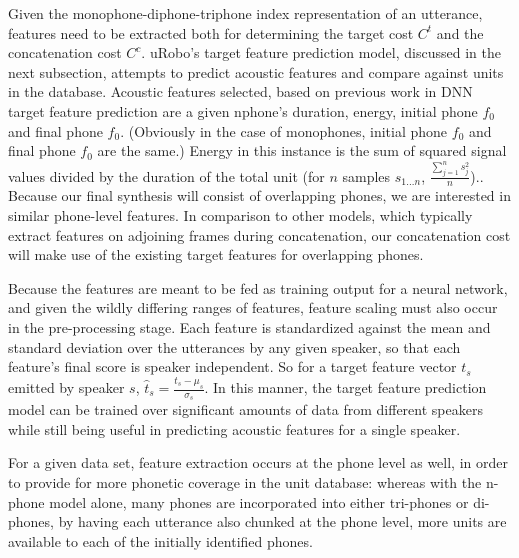 \documentclass[10pt, journal, compsoc]{IEEEtran}
\begin{document}
Given the monophone-diphone-triphone index representation of an utterance, features need to be extracted both for determining the target cost $C^t$ and the concatenation cost $C^c$. uRobo's target feature prediction model, discussed in the next subsection, attempts to predict acoustic features and compare against units in the database. Acoustic features selected, based on previous work in DNN target feature prediction are a given nphone's duration, energy, initial phone $f_0$ and final phone $f_0$. (Obviously in the case of monophones, initial phone $f_0$ and final phone $f_0$ are the same.) Energy in this instance is the sum of squared signal values divided by the duration of the total unit (for $n$ samples $s_{1...n}$, $\frac{\sum_{j=1}^n s_j^2}{n}$).\cite{Jurafsky:2009:SLP:1214993}. Because our final synthesis will consist of overlapping phones, we are interested in similar phone-level features. In comparison to other models, which typically extract features on adjoining frames during concatenation\cite{a102c4924c19470ab180d278d2029de5}, our concatenation cost will make use of the existing target features for overlapping phones.\par
Because the features are meant to be fed as training output for a neural network, and given the wildly differing ranges of features, feature scaling must also occur in the pre-processing stage. Each feature is standardized against the mean and standard deviation over the utterances by any given speaker, so that each feature's final score is speaker independent. So for a target feature vector $t_{s}$ emitted by speaker $s$, $\hat{t}_s=\frac{t_s-\mu_s}{\sigma_s}$\cite{Beigi:2011:FSR:2124400}. In this manner, the target feature prediction model can be trained over significant amounts of data from different speakers while still being useful in predicting acoustic features for a single speaker.\par
For a given data set, feature extraction occurs at the phone level as well, in order to provide for more phonetic coverage in the unit database: whereas with the n-phone model alone, many phones are incorporated into either tri-phones or di-phones, by having each utterance also chunked at the phone level, more units are available to each of the initially identified phones.
\end{document}
